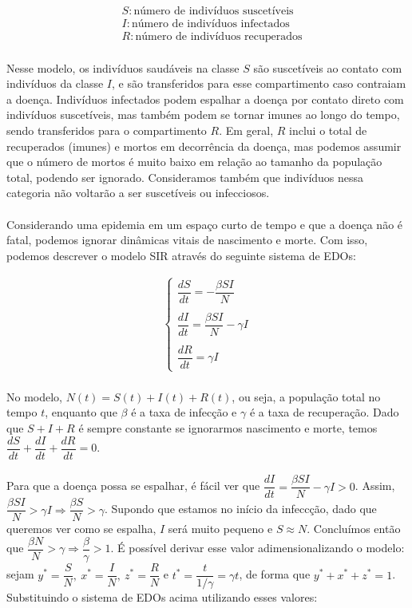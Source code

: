 \documentclass[12pt]{article}
\begin{document}
\begin{align*}
    & S: \text{número de indivíduos suscetíveis} \\
    & I: \text{número de indivíduos infectados} \\
    & R: \text{número de indivíduos recuperados}
\end{align*}
\\
Nesse modelo, os indivíduos saudáveis na classe $S$ são suscetíveis ao contato com indivíduos da classe $I$, e são transferidos para esse compartimento caso contraiam a doença. Indivíduos infectados podem espalhar a doença por contato direto com indivíduos suscetíveis, mas também podem se tornar imunes ao longo do tempo, sendo transferidos para o compartimento $R$. Em geral, $R$ inclui o total de recuperados (imunes) e mortos em decorrência da doença, mas podemos assumir que o número de mortos é muito baixo em relação ao tamanho da população total, podendo ser ignorado. Consideramos também que indivíduos nessa categoria não voltarão a ser suscetíveis ou infecciosos.   
\\\\
Considerando uma epidemia em um espaço curto de tempo e que a doença não é fatal, podemos ignorar dinâmicas vitais de nascimento e morte. Com isso, podemos descrever o modelo SIR através do seguinte sistema de EDOs:

\begin{gather*}
\begin{cases}
\dfrac{dS}{dt} = -\dfrac{\beta SI}{N} \\
\\
\dfrac{dI}{dt} = \dfrac{\beta SI}{N} - \gamma I \\
\\
\dfrac{dR}{dt} = \gamma I
\end{cases}
\end{gather*}
\\
No modelo, $N(t) = S(t)+I(t)+R(t)$, ou seja, a população total no tempo $t$, enquanto que $\beta$ é a taxa de infecção e $\gamma$ é a taxa de recuperação. Dado que $S+I+R$ é sempre constante se ignorarmos nascimento e morte, temos $\dfrac{dS}{dt}+\dfrac{dI}{dt}+\dfrac{dR}{dt} = 0$. 
\\\\
Para que a doença possa se espalhar, é fácil ver que $\dfrac{dI}{dt} = \dfrac{\beta SI}{N} - \gamma I > 0$. Assim, $\dfrac{\beta SI}{N} > \gamma I \Rightarrow \dfrac{\beta S}{N} > \gamma$. Supondo que estamos no início da infeccção, dado que queremos ver como se espalha, $I$ será muito pequeno e $S \approx N$. Concluímos então que $\dfrac{\beta N}{N} > \gamma \Rightarrow \dfrac{\beta}{\gamma} > 1$. É possível derivar esse valor adimensionalizando o modelo: sejam $y^* = \dfrac{S}{N}, \ x^* = \dfrac{I}{N}, \ z^* = \dfrac{R}{N}$ e $t^*=\dfrac{t}{1/\gamma} = \gamma t$, de forma que $y^*+x^*+z^*=1$. Substituindo o sistema de EDOs acima utilizando esses valores:
\end{document}
